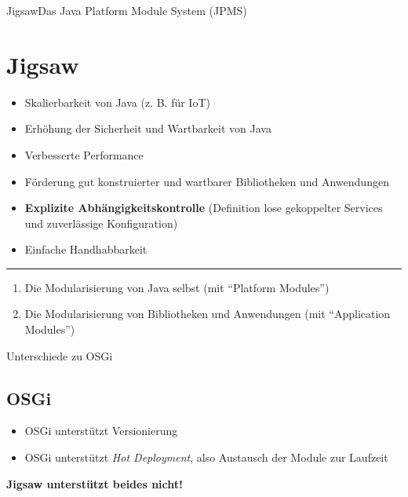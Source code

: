 \documentclass[aspectratio=169,x11names,11pt]{beamer}
\begin{document}
\begin{frame}{Jigsaw}{Das Java Platform Module System (JPMS)}
\section{Jigsaw}
\begin{itemize}
	\item Skalierbarkeit von Java (z. B. für IoT)
	\item Erhöhung der Sicherheit und Wartbarkeit von Java
	\item Verbesserte Performance
	\item Förderung gut konstruierter und wartbarer Bibliotheken und Anwendungen
	\item \textbf{Explizite Abhängigkeitskontrolle} (Definition lose gekoppelter Services und zuverlässige Konfiguration)
	\item Einfache Handhabbarkeit
\end{itemize}
\hrule
\begin{enumerate}
	\item Die Modularisierung von Java selbst (mit \enquote{Platform Modules})
	\item Die Modularisierung von Bibliotheken und Anwendungen (mit \enquote{Application Modules})
\end{enumerate}
\end{frame}

\begin{frame}{Unterschiede zu OSGi}
\subsection{OSGi}
\begin{itemize}
	\item OSGi unterstützt Versionierung
	\item OSGi unterstützt \textit{Hot Deployment}, also Austausch der Module zur Laufzeit
\end{itemize}
\textbf{Jigsaw unterstützt beides nicht!}
\end{frame}
\end{document}
